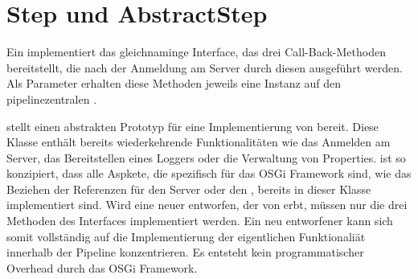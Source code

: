 \section{Step und AbstractStep}
Ein  implementiert das gleichnaminge Interface, das drei
Call-Back-Methoden bereitstellt, die nach der Anmeldung am Server durch diesen
ausgeführt werden.
Als Parameter erhalten diese Methoden jeweils eine Instanz auf den
pipelinezentralen  .



 stellt einen abstrakten Prototyp für eine Implementierung
von  bereit.
Diese Klasse enthält bereits wiederkehrende Funktionalitäten wie das
Anmelden am Server, das Bereitstellen eines Loggers oder die Verwaltung von
Properties.
 ist so konzipiert, dass alle Aspkete, die spezifisch für
das OSGi Framework sind, wie das Beziehen der Referenzen für den
Server oder den , bereits in dieser Klasse
implementiert sind.
Wird eine neuer  entworfen, der von  erbt, müssen
nur die drei Methoden des Interfaces  implementiert werden.
Ein neu entworfener  kann sich somit vollständig auf
die Implementierung der eigentlichen Funktionaliät innerhalb der Pipeline konzentrieren.
Es entsteht kein programmatischer Overhead durch das OSGi
Framework.


